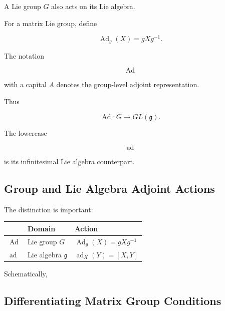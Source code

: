 A Lie group \(G\) also acts on its Lie algebra.

For a matrix Lie group, define

\[ \operatorname{Ad}_g(X)=gXg^{-1}. \]

The notation

\[ \operatorname{Ad} \]

with a capital \(A\) denotes the group-level adjoint representation.

Thus

\[ \operatorname{Ad}:G\to GL(\mathfrak g). \]

The lowercase

\[ \operatorname{ad} \]

is its infinitesimal Lie algebra counterpart.

\subsection{Group and Lie Algebra Adjoint Actions}
\label{subsec:ad-vs-Ad}

The distinction is important:

\begin{center}
\begin{tabularx}{0.9\textwidth}{@{}lXX@{}}
\toprule
 & \textbf{Domain} & \textbf{Action}\\
\midrule
\(\operatorname{Ad}\) & Lie group \(G\) & \(\operatorname{Ad}_g(X)=gXg^{-1}\)\\
\(\operatorname{ad}\) & Lie algebra \(\mathfrak g\) & \(\operatorname{ad}_X(Y)=[X,Y]\)\\
\bottomrule
\end{tabularx}
\end{center}

Schematically,

\begin{center}
\end{center}

\subsection{Differentiating Matrix Group Conditions}
\label{subsec:differentiating-group-conditions}

